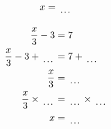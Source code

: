 \documentclass[12pt]{article}
\newcounter{minipagecount}
\begin{document}
\begin{multicols}{2}
\begin{minipage}[t]{0.45\textwidth}
\begin{align*}
        x &= \dotuline{\hspace{5mm}}\\
    \end{align*}
\end{minipage} %
\noindent{(\theminipagecount)}\hspace{0.1mm} %
\begin{minipage}[t]{0.45\textwidth} %
    \vspace{-26pt}  %
    \raggedright %
    \begin{align*} %
        \frac{x}{3} - 3 &= 7\\
        \frac{x}{3} - 3 + \dotuline{\hspace{5mm}} &= 7 + \dotuline{\hspace{5mm}}\\
        \frac{x}{3} &= \dotuline{\hspace{5mm}}\\
        \frac{x}{3} \times\dotuline{\hspace{5mm}} &= \dotuline{\hspace{5mm}} \times\dotuline{\hspace{5mm}}\\
        x &= \dotuline{\hspace{5mm}}\\
    \end{align*}
\end{minipage} %
\noindent{(\theminipagecount)}\hspace{0.1mm} %
\begin{minipage}[t]{0.45\textwidth} %
    \vspace{-26pt}  %

\end{minipage}
\end{multicols}
\end{document}
